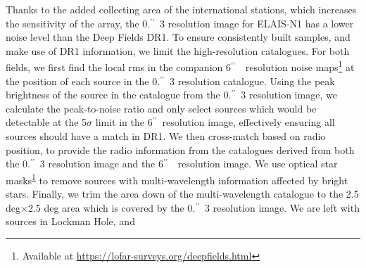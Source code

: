 \documentclass[usenatbib,fleqn,letters]{mnras}
\newcommand{\sarc}{$^{\prime\prime}\!\!$}
\begin{document}
Thanks to the added collecting area of the international stations, which increases the sensitivity of the array, the 0.\sarc\ 3 resolution image for ELAIS-N1 has a lower noise level than the Deep Fields DR1. To ensure consistently built samples, and make use of DR1 information, we limit the high-resolution catalogues. For both fields, 
we first find the local rms in the companion 6\sarc\ \ resolution noise maps\footnote{\label{dr1}Available at \href{https://lofar-surveys.org/deepfields.html}{https://lofar-surveys.org/deepfields.html}} at the position of each source in the 0.\sarc\ 3 resolution catalogue. Using the peak brightness of the source in the catalogue from the 0.\sarc\ 3 resolution image, we calculate the peak-to-noise ratio and only select sources which would be detectable at the 5$\sigma$ limit in the 6\sarc\ resolution image, effectively ensuring all sources should have a match in DR1. We then cross-match based on radio position, to provide the radio information from the catalogues derived from both the 0.\sarc\ 3 resolution image and the 6\sarc\ \ resolution image. We use optical star masks\textsuperscript{\ref{dr1}} to remove sources with multi-wavelength information affected by bright stars. Finally, we trim the area down of the multi-wavelength catalogue to the 2.5 deg$\times$2.5 deg area which is covered by the 0.\sarc\ 3 resolution image. We are left with sources in Lockman Hole, and %
\end{document}
